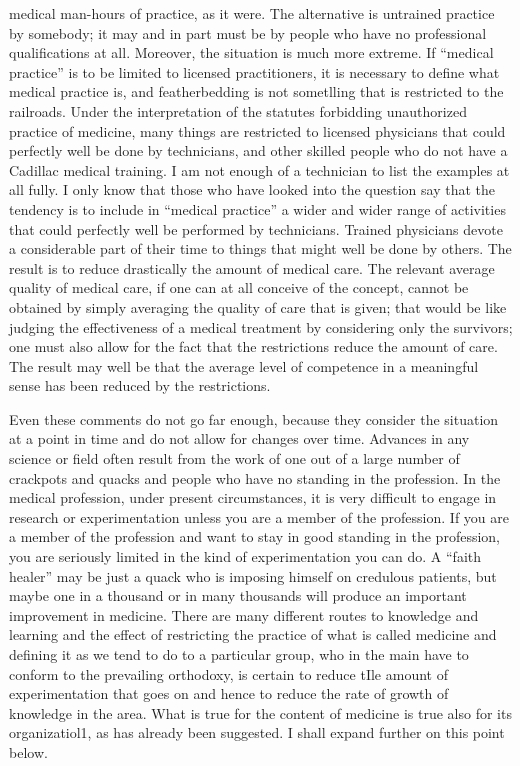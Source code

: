 \documentclass[11pt,openany]{book}
\begin{document}
medical man-hours of practice, as it were. The alternative is untrained practice by somebody; it may and in part must be by people who have no professional qualifications at all. Moreover, the situation is much more extreme. If ``medical practice'' is to be limited to licensed practitioners, it is necessary to define what medical practice is, and featherbedding is not sometlling that is restricted to the railroads. Under the interpretation of the statutes forbidding unauthorized practice of medicine, many things are restricted to licensed physicians that could perfectly well be done by technicians, and other skilled people who do not have a Cadillac medical training. I am not enough of a technician to list the examples at all fully. I only know that those who have looked into the question say that the tendency is to include in ``medical practice'' a wider and wider range of activities that could perfectly well be performed by technicians. Trained physicians devote a considerable part of their time to things that might well be done by others. The result is to reduce drastically the amount of medical care. The relevant average quality of medical care, if one can at all conceive of the concept, cannot be obtained by simply averaging the quality of care that is given; that would be like judging the effectiveness of a medical treatment by considering only the survivors; one must also allow for the fact that the restrictions reduce the amount of care. The result may well be that the average level of competence in a meaningful sense has been reduced by the restrictions.

Even these comments do not go far enough, because they consider the situation at a point in time and do not allow for changes over time. Advances in any science or field often result from the work of one out of a large number of crackpots and quacks and people who have no standing in the profession. In the medical profession, under present circumstances, it is very difficult to engage in research or experimentation unless you are a member of the profession. If you are a member of the profession and want to stay in good standing in the profession, you are seriously limited in the kind of experimentation you can do. A ``faith healer'' may be just a quack who is imposing himself on credulous patients, but maybe one in a thousand or in many thousands will produce an important improvement in medicine. There are many different routes to knowledge and learning and the effect of restricting the practice of what is called medicine and defining it as we tend to do to a particular group, who in the main have to conform to the prevailing orthodoxy, is certain to reduce tIle amount of experimentation that goes on and hence to reduce the rate of growth of knowledge in the area. What is true for the content of medicine is true also for its organizatiol1, as has already been suggested. I shall expand further on this point below.
\end{document}
